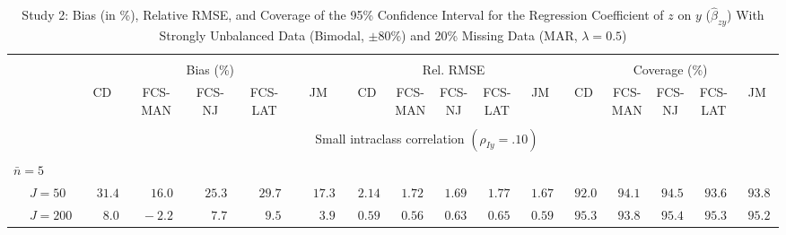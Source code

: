 \begin{sidewaystable}
\begin{threeparttable}
\setlength{\tabcolsep}{1.0pt}
\renewcommand{\arraystretch}{0.95}
\footnotesize
\caption{\small Study 2: Bias (in \%), Relative RMSE, and Coverage of the 95\% Confidence Interval for the Regression Coefficient of $z$ on $y$ ($\hat\beta_{zy}$) With Strongly Unbalanced Data (Bimodal, $\pm 80\%$) and 20\% Missing Data (MAR, $\lambda=0.5$)}
\begin{tabular}{llccccccccccccccc}
\hline\\[-1.8ex]
& & \multicolumn{5}{c}{Bias (\%)} & \multicolumn{5}{c}{Rel. RMSE} & \multicolumn{5}{c}{Coverage (\%)} \\ \cmidrule(r){3-7}\cmidrule(r){8-12}\cmidrule(r){13-17}
 &  & CD & \makecell{FCS-\\MAN} & \makecell{FCS-\\NJ} & \makecell{FCS-\\LAT} & JM & CD & \makecell{FCS-\\MAN} & \makecell{FCS-\\NJ} & \makecell{FCS-\\LAT} & JM & CD & \makecell{FCS-\\MAN} & \makecell{FCS-\\NJ} & \makecell{FCS-\\LAT} & \multicolumn{1}{c}{JM} \\ 
[0.4ex]\hline\\[-1.8ex]
& & \multicolumn{15}{c}{Small intraclass correlation $(\rho_{Iy}=.10)$} \\[0.6ex]\hline\\[-1.8ex]
\multicolumn{4}{l}{$\bar{n}=5$} \\  & \nopagebreak $\;J=50$  & $\phantom{-}31.4\phantom{0}$ & $\phantom{-}16.0\phantom{0}$ & $\phantom{-}25.3\phantom{0}$ & $\phantom{-}29.7\phantom{0}$ & $\phantom{-}17.3\phantom{0}$ & $\phantom{0}2.14\phantom{0}$ & $\phantom{0}1.72\phantom{0}$ & $\phantom{0}1.69\phantom{0}$ & $\phantom{0}1.77\phantom{0}$ & $\phantom{0}1.67\phantom{0}$ & $\phantom{0}92.0\phantom{0}$ & $\phantom{0}94.1\phantom{0}$ & $\phantom{0}94.5\phantom{0}$ & $\phantom{0}93.6\phantom{0}$ & $\phantom{0}93.8\phantom{0}$ \\
 & \nopagebreak $\;J=200$  & $\phantom{0}\phantom{-}8.0\phantom{0}$ & $\phantom{0}{-}2.2\phantom{0}$ & $\phantom{0}\phantom{-}7.7\phantom{0}$ & $\phantom{0}\phantom{-}9.5\phantom{0}$ & $\phantom{0}\phantom{-}3.9\phantom{0}$ & $\phantom{0}0.59\phantom{0}$ & $\phantom{0}0.56\phantom{0}$ & $\phantom{0}0.63\phantom{0}$ & $\phantom{0}0.65\phantom{0}$ & $\phantom{0}0.59\phantom{0}$ & $\phantom{0}95.3\phantom{0}$ & $\phantom{0}93.8\phantom{0}$ & $\phantom{0}95.4\phantom{0}$ & $\phantom{0}95.3\phantom{0}$ & $\phantom{0}95.2\phantom{0}$ \\

\end{tabular}
\end{threeparttable}
\end{sidewaystable}
